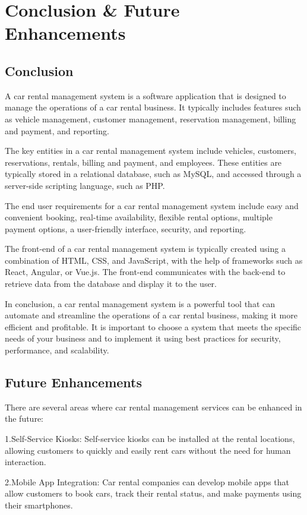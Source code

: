 \chapter{Conclusion \& Future Enhancements}
\section{Conclusion}
A car rental management system is a software application that is designed to manage the operations of a car rental business. It typically includes features such as vehicle management, customer management, reservation management, billing and payment, and reporting.

The key entities in a car rental management system include vehicles, customers, reservations, rentals, billing and payment, and employees. These entities are typically stored in a relational database, such as MySQL, and accessed through a server-side scripting language, such as PHP.

The end user requirements for a car rental management system include easy and convenient booking, real-time availability, flexible rental options, multiple payment options, a user-friendly interface, security, and reporting.

The front-end of a car rental management system is typically created using a combination of HTML, CSS, and JavaScript, with the help of frameworks such as React, Angular, or Vue.js. The front-end communicates with the back-end to retrieve data from the database and display it to the user.

In conclusion, a car rental management system is a powerful tool that can automate and streamline the operations of a car rental business, making it more efficient and profitable. It is important to choose a system that meets the specific needs of your business and to implement it using best practices for security, performance, and scalability.
\pagebreak
\section{Future Enhancements}
There are several areas where car rental management services can be enhanced in the future:


1.Self-Service Kiosks: Self-service kiosks can be installed at the rental locations, allowing customers to quickly and easily rent cars without the need for human interaction.

2.Mobile App Integration: Car rental companies can develop mobile apps that allow customers to book cars, track their rental status, and make payments using their smartphones.

